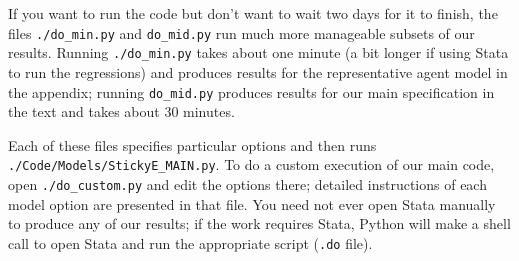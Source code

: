 \documentclass[12pt,pdftex,letterpaper]{article}
\begin{document}
If you want to run the code but don't want to wait two days for it to finish, the files \texttt{./do\_min.py} and \texttt{do\_mid.py} run much more manageable subsets of our results.  Running \texttt{./do\_min.py} takes about one minute (a bit longer if using Stata to run the regressions) and produces results for the representative agent model in the appendix; running \texttt{do\_mid.py} produces results for our main specification in the text and takes about 30 minutes.

Each of these files specifies particular options and then runs \texttt{./Code/Models/StickyE\_MAIN.py}.  To do a custom execution of our main code, open \texttt{./do\_custom.py} and edit the options there; detailed instructions of each model option are presented in that file.  You need not ever open Stata manually to produce any of our results; if the work requires Stata, Python will make a shell call to open Stata and run the appropriate script (\texttt{.do} file).

\vspace{0.5cm}
\end{document}
